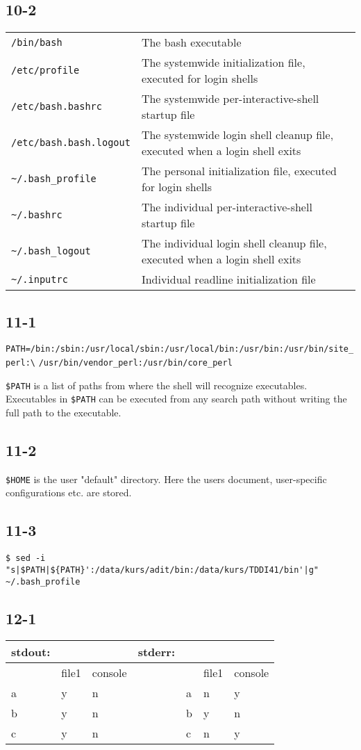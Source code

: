 \subsection{10-2}
\begin{tabular}{ll}
\verb=/bin/bash= &
	The bash executable\\
\verb=/etc/profile= &
	The systemwide initialization file, executed for login shells\\
\verb=/etc/bash.bashrc= &
	The systemwide per-interactive-shell startup file\\
\verb=/etc/bash.bash.logout= &
	The systemwide login shell cleanup file, executed when a login shell exits\\
\verb=~/.bash_profile= &
	The personal initialization file, executed for login shells\\
\verb=~/.bashrc= &
	The individual per-interactive-shell startup file\\
\verb=~/.bash_logout= &
	The individual login shell cleanup file, executed when a login shell exits\\
\verb=~/.inputrc=&
	Individual readline initialization file
\end{tabular}
\subsection{11-1}
\verb+PATH=/bin:/sbin:/usr/local/sbin:/usr/local/bin:/usr/bin:/usr/bin/site_perl:\+
\verb+/usr/bin/vendor_perl:/usr/bin/core_perl+

\verb=$PATH= is a list of paths from where the shell will recognize executables. Executables in \verb=$PATH= can be executed from any search path without writing the full path to the executable.

\subsection{11-2}
\verb=$HOME= is the user "default" directory. Here the users document, user-specific configurations etc. are stored.

\subsection{11-3}
\verb=$ sed -i "s|$PATH|${PATH}':/data/kurs/adit/bin:/data/kurs/TDDI41/bin'|g" ~/.bash_profile=

\subsection{12-1}
\begin{tabular}{l|ll|l|l|ll}
stdout: &&&	stderr:&&\\\hline
 &  file1 &console&&	  & file1& console\\\hline
a&  y&	 n &&		a&  n&     y\\
b&  y&   n &&		b&  y&     n\\
c&  y&	 n &&		c&  n&	   y
\end{tabular}
